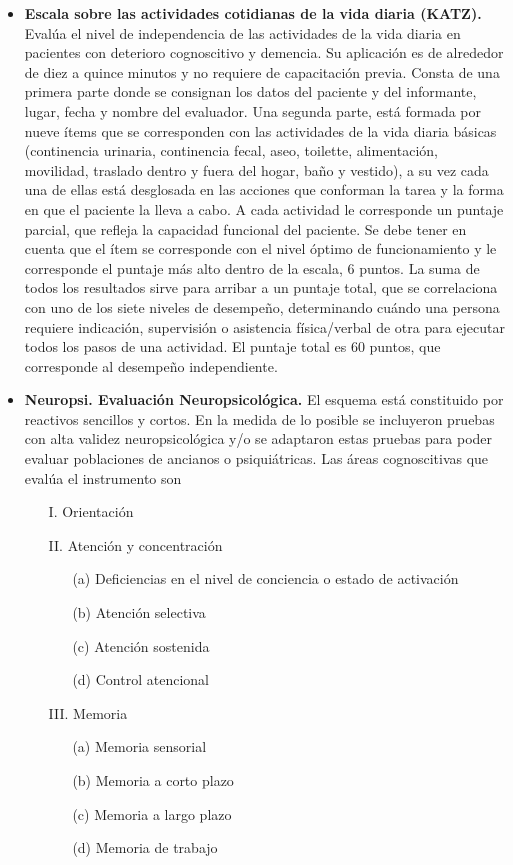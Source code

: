 \begin{itemize}
\item \textbf{Escala sobre las actividades cotidianas de la vida diaria (KATZ).} Eval\'ua el nivel
de independencia de las actividades de la vida diaria en pacientes con deterioro cognoscitivo y 
demencia. Su aplicaci\'on es de alrededor de diez a quince minutos y no requiere de capacitaci\'on 
previa. Consta de una primera parte donde se consignan los datos del paciente y del informante, 
lugar, fecha y nombre del evaluador. Una segunda parte, est\'a formada por nueve \'items que se 
corresponden con las actividades de la vida diaria b\'asicas (continencia urinaria, continencia 
fecal, aseo, toilette, alimentaci\'on, movilidad, traslado dentro y fuera del hogar, ba\~no y 
vestido), a su vez cada una de ellas est\'a desglosada en las acciones que conforman la tarea y la 
forma en que el paciente la lleva a cabo. A cada actividad le corresponde un puntaje parcial, que 
refleja la capacidad funcional del paciente. Se debe tener en cuenta que el \'item se corresponde 
con el nivel \'optimo de funcionamiento y le corresponde el puntaje m\'as alto dentro de la escala,
6 puntos. La suma de todos los resultados sirve para arribar a un puntaje total, que se 
correlaciona con uno de los siete niveles de desempe\~no, determinando cu\'ando una persona 
requiere indicaci\'on, supervisi\'on o asistencia f\'isica/verbal de otra para ejecutar todos los 
pasos de una actividad. El puntaje total es 60 puntos, que corresponde al desempe\~no 
independiente.\cite{Roumec14}

\item \textbf{Neuropsi. Evaluaci\'on Neuropsicol\'ogica.} 
El esquema está constituido por reactivos sencillos y cortos. 
En la medida de lo posible se incluyeron pruebas con alta validez neuropsicológica y/o se 
adaptaron estas pruebas para poder evaluar poblaciones de ancianos o psiqui\'atricas. 
Las \'areas cognoscitivas que eval\'ua 
el instrumento son \cite{Solis03}
\begin{itemize}
\item[I.] Orientaci\'on
\item[II.] Atenci\'on y concentraci\'on
\begin{itemize}
\item[(a)] Deficiencias en el nivel de conciencia o estado de activaci\'on
\item[(b)] Atenci\'on selectiva
\item[(c)] Atenci\'on sostenida
\item[(d)] Control atencional
\end{itemize}
\item[III.] Memoria
\begin{itemize}
\item[(a)] Memoria sensorial
\item[(b)] Memoria a corto plazo
\item[(c)] Memoria a largo plazo
\item[(d)] Memoria de trabajo
\end{itemize}
\end{itemize}

\end{itemize}

